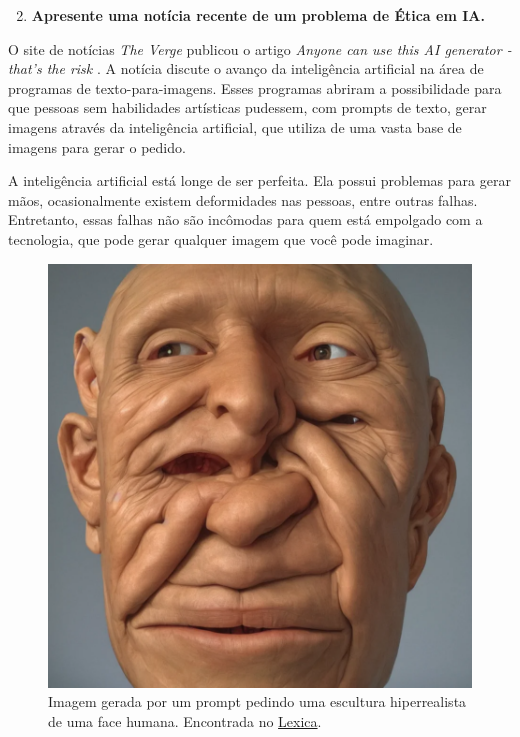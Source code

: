 \begin{enumerate}\setcounter{enumi}{1}\bfseries
    \item \textbf{Apresente uma notícia recente de um problema de Ética em IA.}
\end{enumerate}

O site de notícias \textit{The Verge} publicou o artigo \textit{Anyone can use this AI generator - that's the risk} \cite{verge_ai_generator}. A notícia discute o avanço da inteligência artificial na área de programas de texto-para-imagens. Esses programas abriram a possibilidade para que pessoas sem habilidades artísticas pudessem, com prompts de texto, gerar imagens através da inteligência artificial, que utiliza de uma vasta base de imagens para gerar o pedido.



A inteligência artificial está longe de ser perfeita. Ela possui problemas para gerar mãos, ocasionalmente existem deformidades nas pessoas, entre outras falhas. Entretanto, essas falhas não são incômodas para quem está empolgado com a tecnologia, que pode gerar qualquer imagem que você pode imaginar.

\begin{figure}[h]
\centering
\includegraphics[scale=0.15]{face_deformada.png}
\caption{Imagem gerada por um prompt pedindo uma escultura hiperrealista de uma face humana. Encontrada no \href{https://lexica.art/prompt/10023e09-97d2-4ba3-8e01-4ee149a42c6f}{Lexica}.}
\end{figure}


